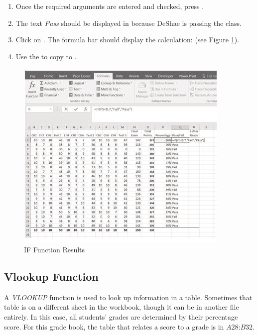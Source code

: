 \begin{enumbox}
	\begin{enumerate}
		\item Once the required arguments are entered and checked, press . 
		\item The text \textit{Pass} should be displayed in  because DeShae is passing the class.
		\item Click on . The formula bar should display the  calculation:  (see Figure \ref{03:fig11}).
		\item Use the  to copy  to .
	\end{enumerate}
\end{enumbox}
	
\begin{figure}[H]
	\centering
	\includegraphics[width=\maxwidth{.95\linewidth}]{gfx/ch03_fig11}
	\caption{IF Function Results}
	\label{03:fig11}
\end{figure}

\subsection{Vlookup Function}

A \textit{VLOOKUP} function is used to look up information in a table. Sometimes that table is on a different sheet in the workbook, though it can be in another file entirely. In this case, all students' grades are determined by their percentage score. For this grade book, the table that relates a score to a grade is in $ A28 $:$ B32 $.

